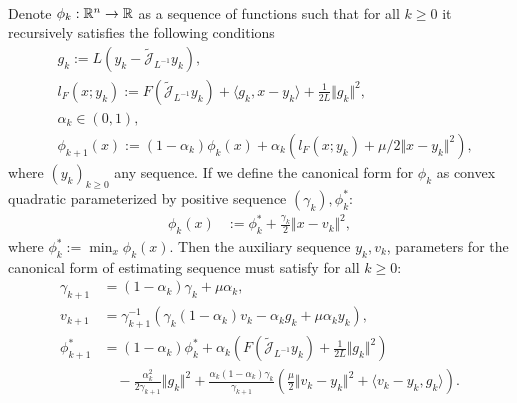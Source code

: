 \documentclass[12pt]{article}
\begin{document}
    \begin{theorem}\label{thm:canon-prox-grad-est-seq}
        \; \\
        Denote $\phi_k:\mathbb R^n \rightarrow\mathbb R$ as a sequence of functions such that for all $k\ge 0$ it recursively satisfies the following conditions 
        \begin{align*}
            & g_k := L(y_k - \widetilde{\mathcal J}_{L^{-1}} y_k),
            \\
            & l_F(x; y_k) := 
                F\left(\widetilde{\mathcal J}_{L^{-1}} y_k\right) 
                + \langle g_k, x - y_k\rangle 
                + \frac{1}{2L}\Vert g_k\Vert^2, 
            \\
            & \alpha_k \in (0, 1),
            \\
            & 
            \phi_{k + 1}(x)
            := (1 - \alpha_k)\phi_k (x) + 
            \alpha_k (l_F(x; y_k) + \mu/2\Vert x - y_k\Vert^2), 
        \end{align*}
        where $(y_k)_{k\ge 0}$ any sequence. 
        If we define the canonical form for $\phi_k$ as convex quadratic parameterized by positive sequence $(\gamma_k), \phi_k^*$:  
        \begin{align*}
            \phi_k(x) &:= \phi_k^* + \frac{\gamma_k}{2}\Vert x - v_k\Vert^2, 
        \end{align*}
        where $\phi_k^* := \min_{x} \phi_k(x)$. 
        Then the auxiliary sequence $y_k, v_k$, parameters for the canonical form of estimating sequence must satisfy for all $k\ge 0$: 
        {\small
        \begin{align*}      
            \gamma_{k + 1} &= (1 - \alpha_k) \gamma_k + \mu \alpha_k,
            \\
            v_{k + 1} &= \gamma_{k + 1}^{-1}
            (\gamma_k(1 - \alpha_k)v_k - \alpha_k g_k + \mu \alpha_k y_k),
            \\
            \phi_{k + 1}^* &= 
            (1 - \alpha_k)\phi_k^*
            + \alpha_k\left(
                F\left(\widetilde{\mathcal J}_{L^{-1}} y_k\right) 
                + \frac{1}{2L}\Vert g_k\Vert^2 
            \right) 
            \\
                &\quad 
                - \frac{\alpha_k^2}{2 \gamma_{k + 1}} \Vert g_k\Vert^2 
                + 
                \frac{\alpha_k(1 - \alpha_k)\gamma_k}{\gamma_{k + 1}} 
                \left(
                    \frac{\mu}{2}\Vert v_k - y_k\Vert^2 
                    + \langle v_k - y_k , g_k\rangle
                \right). 
        \end{align*}
        }
    \end{theorem}
    
\end{document}

